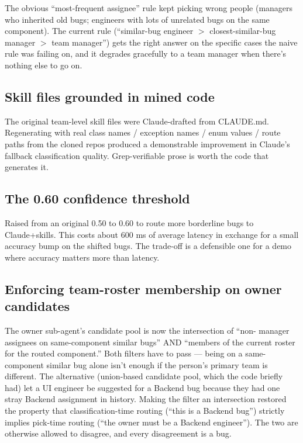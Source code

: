 \documentclass[11pt,a4paper]{article}
\begin{document}
The obvious ``most-frequent assignee'' rule kept picking wrong people
(managers who inherited old bugs; engineers with lots of unrelated bugs
on the same component). The current rule
(``similar-bug engineer $>$ closest-similar-bug manager $>$
team manager'') gets the right answer on the specific cases the naive
rule was failing on, and it degrades gracefully to a team manager when
there's nothing else to go on.

\subsection{Skill files grounded in mined code}

The original team-level skill files were Claude-drafted from CLAUDE.md.
Regenerating with real class names / exception names / enum values / route
paths from the cloned repos produced a demonstrable improvement in
Claude's fallback classification quality. Grep-verifiable prose is worth
the code that generates it.

\subsection{The 0.60 confidence threshold}

Raised from an original 0.50 to 0.60 to route more borderline bugs to
Claude+skills. This costs about 600 ms of average latency in exchange for
a small accuracy bump on the shifted bugs. The trade-off is a defensible
one for a demo where accuracy matters more than latency.

\subsection{Enforcing team-roster membership on owner candidates}

The owner sub-agent's candidate pool is now the intersection of ``non-
manager assignees on same-component similar bugs'' AND ``members of the
current roster for the routed component.'' Both filters have to pass ---
being on a same-component similar bug alone isn't enough if the person's
primary team is different. The alternative (union-based candidate pool,
which the code briefly had) let a UI engineer be suggested for a Backend
bug because they had one stray Backend assignment in history. Making the
filter an intersection restored the property that classification-time
routing (``this is a Backend bug'') strictly implies pick-time routing
(``the owner must be a Backend engineer''). The two are otherwise
allowed to disagree, and every disagreement is a bug.
\end{document}
